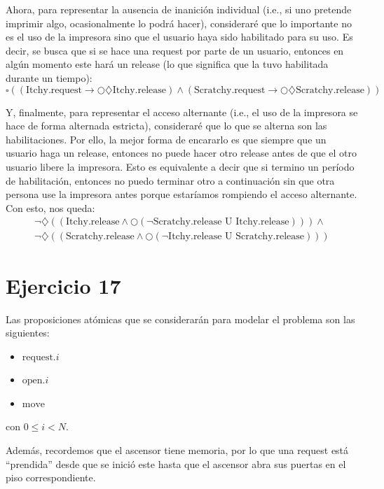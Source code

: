 \documentclass{article}
\begin{document}
Ahora, para representar la ausencia de inanición individual (i.e., si uno pretende imprimir algo, ocasionalmente lo podrá hacer), consideraré que lo importante no es el uso de la impresora sino que el usuario haya sido habilitado para su uso.
Es decir, se busca que si se hace una request por parte de un usuario, entonces en algún momento este hará un release (lo que significa que la tuvo habilitada durante un tiempo):
\begin{equation*}
	\square ((\text{Itchy.request} \to \bigcirc \diamondsuit \text{Itchy.release}) \land (\text{Scratchy.request} \to \bigcirc \diamondsuit \text{Scratchy.release}))
\end{equation*}

Y, finalmente, para representar el acceso alternante (i.e., el uso de la impresora se hace de forma alternada estricta), consideraré que lo que se alterna son las habilitaciones.
Por ello, la mejor forma de encararlo es que siempre que un usuario haga un release, entonces no puede hacer otro release antes de que el otro usuario libere la impresora.
Esto es equivalente a decir que si termino un período de habilitación, entonces no puedo terminar otro a continuación sin que otra persona use la impresora antes porque estaríamos rompiendo el acceso alternante.
Con esto, nos queda:
\begin{equation*}
	\begin{aligned}
		\neg \diamondsuit \left(\left(\text{Itchy.release} \land \bigcirc \left(\neg \text{Scratchy.release U Itchy.release}\right)\right)\right) \land \\
		\neg \diamondsuit \left(\left(\text{Scratchy.release} \land \bigcirc \left(\neg \text{Itchy.release U Scratchy.release}\right)\right)\right)
	\end{aligned}
\end{equation*}

\section*{Ejercicio 17}
Las proposiciones atómicas que se considerarán para modelar el problema son las siguientes:
\begin{itemize}
	\item $\text{request}.i$
	\item $\text{open}.i$
	\item $\text{move}$
\end{itemize}
con $0 \leq i < N$.

Además, recordemos que el ascensor tiene memoria, por lo que una request está ``prendida'' desde que se inició este hasta que el ascensor abra sus puertas en el piso correspondiente.
\end{document}
